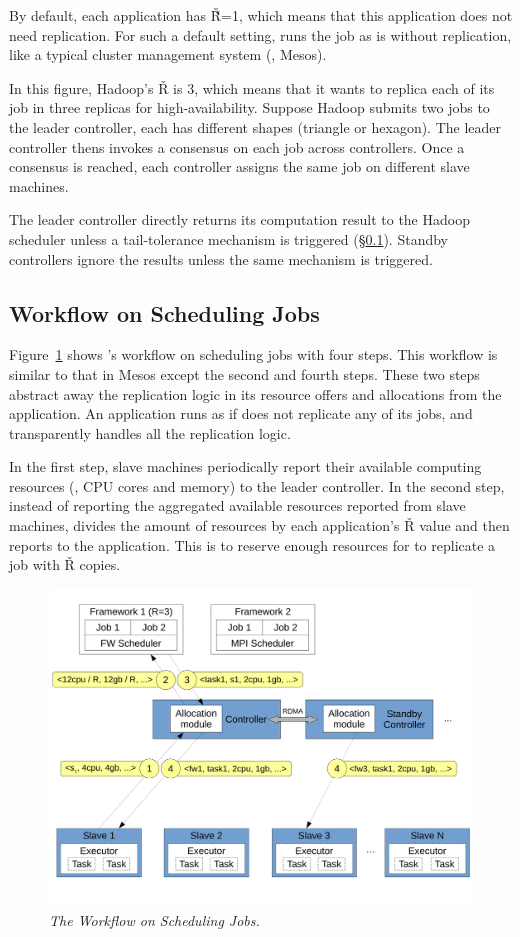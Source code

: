 By default, each application has \v{\v{R}=1}, which means that this application 
does not need replication. For such a default setting, \xxx runs the job as is 
without replication, like a typical cluster management system (\eg, Mesos).

In this figure, Hadoop's \v{R} is 3, which means that it wants to replica each 
of its job in three replicas for high-availability. Suppose Hadoop submits two 
jobs to the leader controller, each has different shapes (triangle or 
hexagon). The leader controller thens invokes a consensus on each job across 
controllers. Once a consensus is reached, each controller assigns the same job 
on different slave machines.

The leader controller directly returns its computation result to the Hadoop 
scheduler unless a tail-tolerance mechanism is triggered (\S\ref{sec:workflow}). 
Standby controllers ignore the results unless the same mechanism is triggered.



\subsection{Workflow on Scheduling Jobs} \label{sec:workflow}

Figure~\ref{fig:workflow} shows \xxx's workflow on scheduling jobs with four 
steps. This workflow is similar to that in Mesos except the second and fourth 
steps. These two steps \xxx abstract away the replication logic in its resource 
offers and allocations from the application. An application runs as if \xxx does 
not replicate any of its jobs, and \xxx transparently handles all the 
replication logic.

In the first step, slave machines periodically report their available computing 
resources (\eg, CPU cores and memory) to the leader controller. In the second 
step, instead of reporting the aggregated available resources reported from 
slave machines, \xxx divides the amount of resources by each application's 
\v{R} value and then reports to the application. This is to reserve enough 
resources for \xxx to replicate a job with \v{R} copies.

\begin{figure}[t]
\centering
\includegraphics[width=.47\textwidth]{figures/flow}
\vspace{-.2in}
\caption{{\em The \xxx Workflow on Scheduling Jobs.}} \label{fig:workflow}
\vspace{.05in}
\end{figure}


